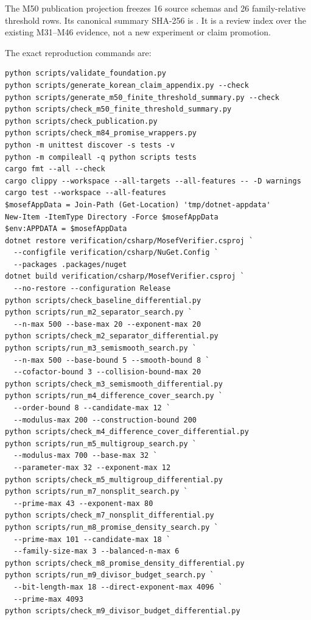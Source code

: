 \documentclass[11pt]{article}
\begin{document}
The M50 publication projection
 freezes 16 source schemas
and 26 family-relative threshold rows. Its canonical summary SHA-256 is
\texttt{}.
It is a review index over the existing M31--M46 evidence, not a new
experiment or claim promotion.

The exact reproduction commands are:

\begin{verbatim}
python scripts/validate_foundation.py
python scripts/generate_korean_claim_appendix.py --check
python scripts/generate_m50_finite_threshold_summary.py --check
python scripts/check_m50_finite_threshold_summary.py
python scripts/check_publication.py
python scripts/check_m84_promise_wrappers.py
python -m unittest discover -s tests -v
python -m compileall -q python scripts tests
cargo fmt --all --check
cargo clippy --workspace --all-targets --all-features -- -D warnings
cargo test --workspace --all-features
$mosefAppData = Join-Path (Get-Location) 'tmp/dotnet-appdata'
New-Item -ItemType Directory -Force $mosefAppData
$env:APPDATA = $mosefAppData
dotnet restore verification/csharp/MosefVerifier.csproj `
  --configfile verification/csharp/NuGet.Config `
  --packages .packages/nuget
dotnet build verification/csharp/MosefVerifier.csproj `
  --no-restore --configuration Release
python scripts/check_baseline_differential.py
python scripts/run_m2_separator_search.py `
  --n-max 500 --base-max 20 --exponent-max 20
python scripts/check_m2_separator_differential.py
python scripts/run_m3_semismooth_search.py `
  --n-max 500 --base-bound 5 --smooth-bound 8 `
  --cofactor-bound 3 --collision-bound-max 20
python scripts/check_m3_semismooth_differential.py
python scripts/run_m4_difference_cover_search.py `
  --order-bound 8 --candidate-max 12 `
  --modulus-max 200 --construction-bound 200
python scripts/check_m4_difference_cover_differential.py
python scripts/run_m5_multigroup_search.py `
  --modulus-max 700 --base-max 32 `
  --parameter-max 32 --exponent-max 12
python scripts/check_m5_multigroup_differential.py
python scripts/run_m7_nonsplit_search.py `
  --prime-max 43 --exponent-max 80
python scripts/check_m7_nonsplit_differential.py
python scripts/run_m8_promise_density_search.py `
  --prime-max 101 --candidate-max 18 `
  --family-size-max 3 --balanced-n-max 6
python scripts/check_m8_promise_density_differential.py
python scripts/run_m9_divisor_budget_search.py `
  --bit-length-max 18 --direct-exponent-max 4096 `
  --prime-max 4093
python scripts/check_m9_divisor_budget_differential.py

\end{verbatim}
\end{document}
